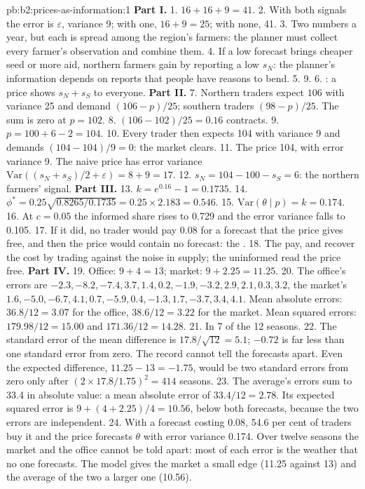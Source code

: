 \begin{solution}{pb:b2:prices-as-information:1}
\textbf{Part I.}
1. $16 + 16 + 9 = 41$.
2. With both signals the error is $\varepsilon$, variance 9; with one, $16 + 9 = 25$; with none, 41.
3. Two numbers a year, but each is spread among the region's farmers: the planner must collect every farmer's
observation and combine them.
4. If a low forecast brings cheaper seed or more aid, northern farmers gain by reporting a low $s_N$: the
planner's information depends on reports that people have reasons to bend.
5. 9.
6. : a  price shows $s_N + s_S$ to everyone.
\textbf{Part II.}
7. Northern traders expect $106$ with variance 25 and demand $(106 - p)/25$; southern traders $(98 - p)/25$. The
sum is zero at $p = 102$.
8. $(106 - 102)/25 = 0.16$ contracts.
9. $p = 100 + 6 - 2 = 104$.
10. Every trader then expects 104 with variance 9 and demands $(104 - 104)/9 = 0$: the market clears.
11. The price 104, with error variance 9. The naive price has error variance $\mathrm{Var}((s_N + s_S)/2 + \varepsilon)
= 8 + 9 = 17$.
12. $s_N = 104 - 100 - s_S = 6$: the northern farmers' signal.
\textbf{Part III.}
13. $k = e^{0.16} - 1 = 0.1735$.
14. $\phi^* = 0.25\sqrt{0.8265/0.1735} = 0.25 \times 2.183 = 0.546$.
15. $\mathrm{Var}(\theta \mid p) = k = 0.174$.
16. At $c = 0.05$ the informed share rises to 0.729 and the error variance falls to 0.105.
17. If it did, no trader would pay 0.08 for a forecast that the price gives free, and then the price would
contain no forecast: the .
18. The  pay, and recover the cost by trading against the noise in supply; the uninformed
read the price free.
\textbf{Part IV.}
19. Office: $9 + 4 = 13$; market: $9 + 2.25 = 11.25$.
20. The office's errors are $-2.3, -8.2, -7.4, 3.7, 1.4, 0.2, -1.9, -3.2, 2.9, 2.1, 0.3, 3.2$, the market's
$1.6, -5.0, -6.7, 4.1, 0.7, -5.9, 0.4, -1.3, 1.7, -3.7, 3.4, 4.1$. Mean absolute errors: $36.8/12 = 3.07$ for the
office, $38.6/12 = 3.22$ for the market. Mean squared errors: $179.98/12 = 15.00$ and $171.36/12 = 14.28$.
21. In 7 of the 12 seasons.
22. The standard error of the mean difference is $17.8/\sqrt{12} = 5.1$; $-0.72$ is far less than one standard
error from zero. The record cannot tell the forecasts apart. Even the expected difference, $11.25 - 13 = -1.75$,
would be two standard errors from zero only after $(2 \times 17.8/1.75)^2 = 414$ seasons.
23. The average's errors sum to 33.4 in absolute value: a mean absolute error of $33.4/12 = 2.78$. Its expected
squared error is $9 + (4 + 2.25)/4 = 10.56$, below both forecasts, because the two errors are independent.
24. With a forecast costing 0.08, 54.6 per cent of traders buy it and the price forecasts $\theta$ with error
variance 0.174. Over twelve seasons the market and the office cannot be told apart: most of each error is the
weather that no one forecasts. The model gives the market a small edge (11.25 against 13) and the average of the
two a larger one (10.56).
\end{solution}
